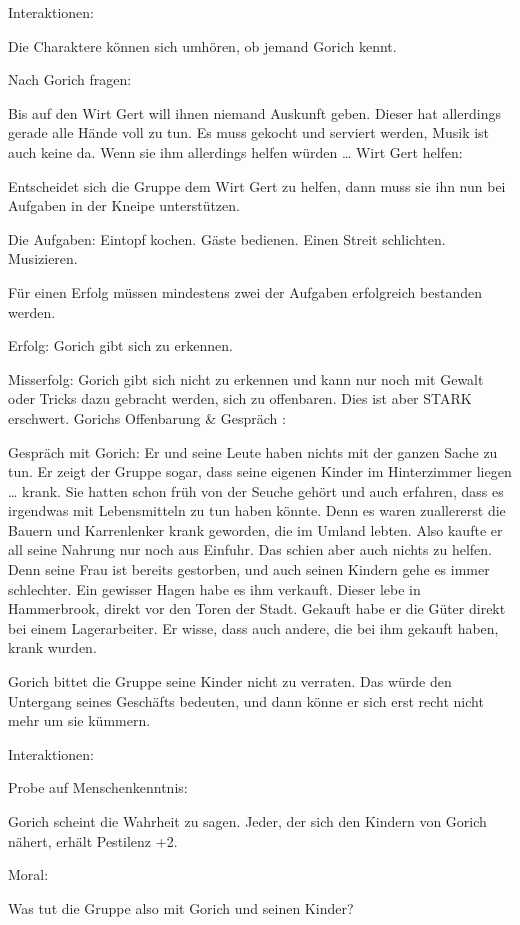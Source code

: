 Interaktionen:

Die Charaktere können sich umhören, ob jemand Gorich kennt.

Nach Gorich fragen:

Bis auf den Wirt Gert will ihnen niemand Auskunft geben.
Dieser hat allerdings gerade alle Hände voll zu tun.
Es muss gekocht und serviert werden, Musik ist auch keine da. Wenn sie ihm allerdings helfen würden …
Wirt Gert helfen:

Entscheidet sich die Gruppe dem Wirt Gert zu helfen, dann muss sie ihn nun bei Aufgaben in der Kneipe unterstützen.

Die Aufgaben:
Eintopf kochen.
Gäste bedienen.
Einen Streit schlichten.
Musizieren.

Für einen Erfolg müssen mindestens zwei der Aufgaben erfolgreich bestanden werden.

Erfolg:
Gorich gibt sich zu erkennen.

Misserfolg:
Gorich gibt sich nicht zu erkennen und kann nur noch mit Gewalt oder Tricks dazu gebracht werden, sich zu offenbaren. Dies ist aber STARK erschwert.
Gorichs Offenbarung \& Gespräch
:

Gespräch mit Gorich: Er und seine Leute haben nichts mit der ganzen Sache zu tun. Er zeigt der Gruppe sogar, dass seine eigenen Kinder im Hinterzimmer liegen … krank. Sie hatten schon früh von der Seuche gehört und auch erfahren, dass es irgendwas mit Lebensmitteln zu tun haben könnte. Denn es waren zuallererst die Bauern und Karrenlenker krank geworden, die im Umland lebten. Also kaufte er all seine Nahrung nur noch aus Einfuhr. Das schien aber auch nichts zu helfen. Denn seine Frau ist bereits gestorben, und auch seinen Kindern gehe es immer schlechter. Ein gewisser Hagen habe es ihm verkauft. Dieser lebe in Hammerbrook, direkt vor den Toren der Stadt. Gekauft habe er die Güter direkt bei einem Lagerarbeiter. Er wisse, dass auch andere, die bei ihm gekauft haben, krank wurden.

Gorich bittet die Gruppe seine Kinder nicht zu verraten. Das würde den Untergang seines Geschäfts bedeuten, und dann könne er sich erst recht nicht mehr um sie kümmern.

Interaktionen:

Probe auf Menschenkenntnis:

Gorich scheint die Wahrheit zu sagen.
Jeder, der sich den Kindern von Gorich nähert, erhält Pestilenz +2.

Moral:

Was tut die Gruppe also mit Gorich und seinen Kinder?



